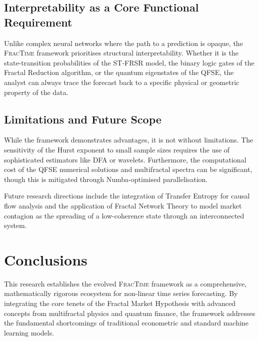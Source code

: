\documentclass[12pt,a4paper]{article}
\begin{document}
\subsection{Interpretability as a Core Functional Requirement}

Unlike complex neural networks where the path to a prediction is opaque,
the \textsc{FracTime} framework prioritises structural interpretability.
Whether it is the state-transition probabilities of the ST-FRSR model, the
binary logic gates of the Fractal Reduction algorithm, or the quantum
eigenstates of the QFSE, the analyst can always trace the forecast back to
a specific physical or geometric property of the data.

\subsection{Limitations and Future Scope}

While the framework demonstrates advantages, it is not without limitations.
The sensitivity of the Hurst exponent to small sample sizes requires the
use of sophisticated estimators like DFA or wavelets.  Furthermore, the
computational cost of the QFSE numerical solutions and multifractal spectra
can be significant, though this is mitigated through Numba-optimised
parallelisation.

Future research directions include the integration of Transfer Entropy for
causal flow analysis and the application of Fractal Network Theory to model
market contagion as the spreading of a low-coherence state through an
interconnected system.

\section{Conclusions}
\label{sec:conclusions}

This research establishes the evolved \textsc{FracTime} framework as a
comprehensive, mathematically rigorous ecosystem for non-linear time series
forecasting.  By integrating the core tenets of the Fractal Market Hypothesis
with advanced concepts from multifractal physics and quantum finance, the
framework addresses the fundamental shortcomings of traditional econometric
and standard machine learning models.
\end{document}
